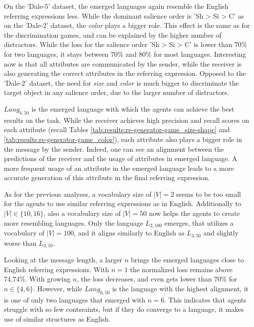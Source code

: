 On the 'Dale-5' dataset, the emerged languages again resemble the English referring expressions less.
While the dominant salience order is 'Sh > Si > C' as on the 'Dale-2' dataset, the \emph{color} plays a bigger role.
This effect is the same as for the discrimination games, and can be explained by the higher number of distractors.
While the loss for the salience order 'Sh > Si > C' is lower than 70\% for two languages, it stays between 70\% and 80\% for most languages.
Interesting now is that all attributes are communicated by the sender, while the receiver is also generating the correct attributes in the referring expression.
Opposed to the 'Dale-2' dataset, the need for \emph{size} and \emph{color} is much bigger to discriminate the target object in any salience order, due to the larger number of distractors.

$Lang_{6,50}$ is the emerged language with which the agents can achieve the best results on the task.
While the receiver achieves high precision and recall scores on each attribute (recall Tables \ref{tab:results:re-generator-game_size-shape} and \ref{tab:results:re-generator-game_color}), each attribute also plays a bigger role in the message by the sender.
Indeed, one can see an alignment between the predictions of the receiver and the usage of attributes in emerged language.
A more frequent usage of an attribute in the emerged language leads to a more accurate generation of this attribute in the final referring expression.

As for the previous analyses, a vocabulary size of $|V|=2$ seems to be too small for the agents to use similar referring expressions as in English.
Additionally to $|V| \in \{10,16\}$, also a vocabulary size of $|V|=50$ now helps the agents to create more resembling languages.
Only the language $L_{3,100}$ emerges, that utilizes a vocabulary of $|V|=100$, and it aligns similarly to English as $L_{3,50}$ and slightly worse than $L_{3,10}$.

Looking at the message length, a larger $n$ brings the emerged languages close to English referring expressions.
With $n=1$ the normalized loss remains above 74,74\%.
With growing $n$, the loss decreases, and even gets lower than 70\% for $n \in \{4,6\}$.
However, while $Lang_{6,50}$ is the language with the highest alignment, it is one of only two languages that emerged with $n=6$.
This indicates that agents struggle with so few contsraints, but if they do converge to a language, it makes use of similar structures as English.


